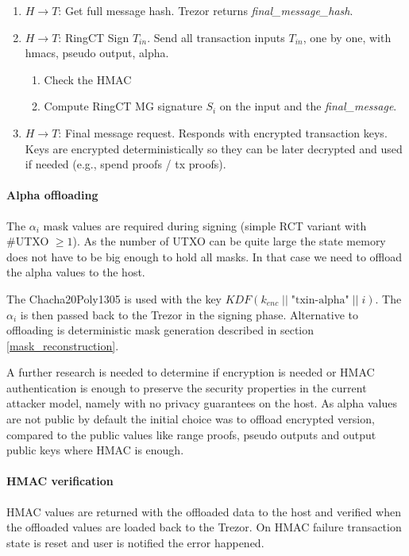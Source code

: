 \documentclass[]{article}
\begin{document}
\begin{enumerate}
	\item $H \rightarrow T$: Get full message hash. Trezor returns \emph{final\_message\_hash}.
	
	\item $H \rightarrow T$: RingCT Sign $T_{in}$. Send all transaction inputs $T_{in}$, one by one, with hmacs, pseudo output, alpha.
	\begin{enumerate}
		\item Check the HMAC
		
		\item Compute RingCT MG signature $S_i$ on the input and the \emph{final\_message}.
		
	\end{enumerate} 

	\item $H \rightarrow T$: Final message request. Responds with encrypted transaction keys. Keys are encrypted deterministically so they can be later decrypted and used if needed (e.g., spend proofs / tx proofs).
	
\end{enumerate}


\paragraph{Alpha offloading}
The $\alpha_i$ mask values are required during signing (simple RCT variant with \#UTXO $\ge 1$). As the number of UTXO can be quite large the state memory does not have to be big enough to hold all masks. In that case we need to offload the alpha values to the host. 

The Chacha20Poly1305 is used with the key $\textit{KDF}\left(k_{enc} \; || \; \text{"txin-alpha"} \; || \; i\right)$. The $\alpha_i$ is then passed back to the Trezor in the signing phase. Alternative to offloading is deterministic mask generation described in section \ref{mask_reconstruction}.

A further research is needed to determine if encryption is needed or HMAC authentication is enough to preserve the security properties in the current attacker model, namely with no privacy guarantees on the host. As alpha values are not public by default the initial choice was to offload encrypted version, compared to the public values like range proofs, pseudo outputs and output public keys where HMAC is enough.

\paragraph{HMAC verification}
HMAC values are returned with the offloaded data to the host and verified when the offloaded values are loaded back to the Trezor. 
On HMAC failure transaction state is reset and user is notified the error happened.
\end{document}
